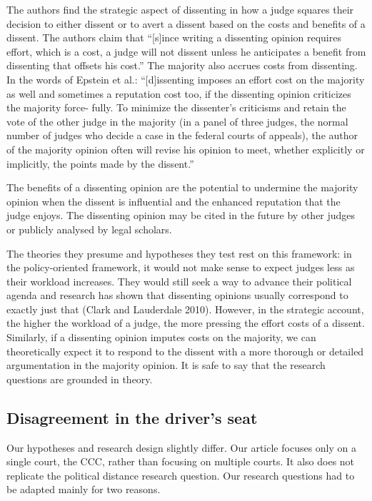 \documentclass[
  11pt,
]{article}
\begin{document}
The authors find the strategic aspect of dissenting in how a judge
squares their decision to either dissent or to avert a dissent based on
the costs and benefits of a dissent. The authors claim that
``{[}s{]}ince writing a dissenting opinion requires effort, which is a
cost, a judge will not dissent unless he anticipates a benefit from
dissenting that offsets his cost.'' The majority also accrues costs from
dissenting. In the words of Epstein et al.: ``{[}d{]}issenting imposes
an effort cost on the majority as well and sometimes a reputation cost
too, if the dissenting opinion criticizes the majority force- fully. To
minimize the dissenter's criticisms and retain the vote of the other
judge in the majority (in a panel of three judges, the normal number of
judges who decide a case in the federal courts of appeals), the author
of the majority opinion often will revise his opinion to meet, whether
explicitly or implicitly, the points made by the dissent.''

The benefits of a dissenting opinion are the potential to undermine the
majority opinion when the dissent is influential and the enhanced
reputation that the judge enjoys. The dissenting opinion may be cited in
the future by other judges or publicly analysed by legal scholars.

The theories they presume and hypotheses they test rest on this
framework: in the policy-oriented framework, it would not make sense to
expect judges less as their workload increases. They would still seek a
way to advance their political agenda and research has shown that
dissenting opinions usually correspond to exactly just that (Clark and
Lauderdale 2010). However, in the strategic account, the higher the
workload of a judge, the more pressing the effort costs of a dissent.
Similarly, if a dissenting opinion imputes costs on the majority, we can
theoretically expect it to respond to the dissent with a more thorough
or detailed argumentation in the majority opinion. It is safe to say
that the research questions are grounded in theory.

\hypertarget{disagreement-in-the-drivers-seat}{%
\subsection{Disagreement in the driver's
seat}\label{disagreement-in-the-drivers-seat}}

Our hypotheses and research design slightly differ. Our article focuses
only on a single court, the CCC, rather than focusing on multiple
courts. It also does not replicate the political distance research
question. Our research questions had to be adapted mainly for two
reasons.
\end{document}
